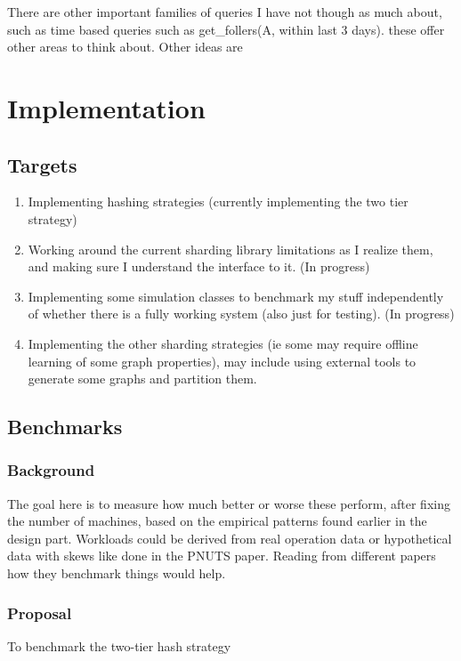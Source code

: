 \documentclass{article}
\begin{document}
There are other important families of queries I have not though as much about, such as time based queries such as get\_follers(A, within last 3 days).  these offer other areas to think about. Other ideas are 

\section{Implementation}
\subsection{Targets}

\begin{enumerate}
\item Implementing hashing strategies (currently implementing the two tier strategy)
\item Working around the current sharding library limitations as I realize them, and making sure  I understand the interface to it. (In progress)
\item Implementing some simulation classes to benchmark my stuff  independently of whether there is a fully working system (also just for testing). (In progress)
\item Implementing the other sharding strategies (ie some may require offline learning of some graph properties), may include using external tools to generate some graphs and partition them.

\end{enumerate}

\subsection{Benchmarks}
\subsubsection{Background}
The goal here is to measure how much better or worse these perform, after fixing the number of machines, based on the empirical patterns found earlier in the design part.  Workloads could be derived from real operation data or hypothetical data with skews like done in the PNUTS paper. Reading from different papers how they benchmark things would help.
\subsubsection{Proposal}


To benchmark the two-tier hash strategy 
\end{document}
